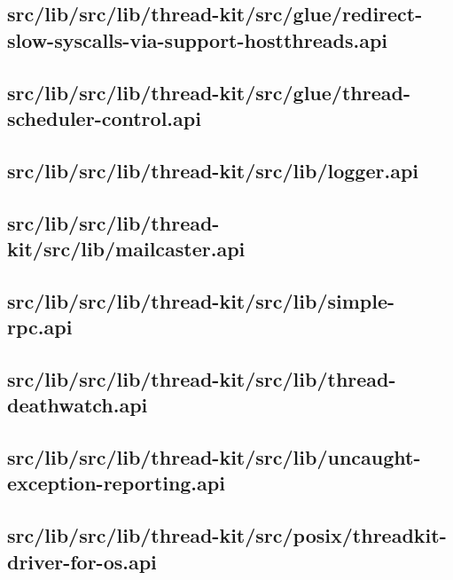 \subsection{src/lib/src/lib/thread-kit/src/glue/redirect-slow-syscalls-via-support-hostthreads.api}


\subsection{src/lib/src/lib/thread-kit/src/glue/thread-scheduler-control.api}


\subsection{src/lib/src/lib/thread-kit/src/lib/logger.api}


\subsection{src/lib/src/lib/thread-kit/src/lib/mailcaster.api}


\subsection{src/lib/src/lib/thread-kit/src/lib/simple-rpc.api}


\subsection{src/lib/src/lib/thread-kit/src/lib/thread-deathwatch.api}


\subsection{src/lib/src/lib/thread-kit/src/lib/uncaught-exception-reporting.api}


\subsection{src/lib/src/lib/thread-kit/src/posix/threadkit-driver-for-os.api}


